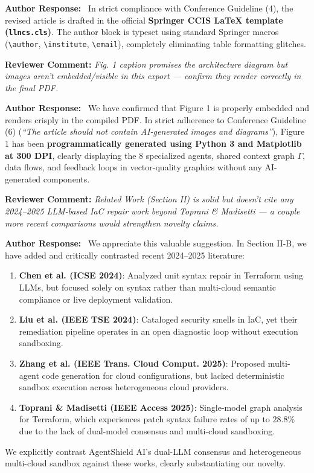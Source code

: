 \documentclass[11pt,a4paper]{article}
\newcommand{\reviewercomment}[1]{%
    \vspace{0.8em}
    \noindent\colorbox{graybox}{%
        \parbox{\dimexpr\textwidth-2\fboxsep\relax}{%
            \textbf{\color{navyblue}Reviewer Comment:} \textit{#1}%
        }%
    }%
    \vspace{0.4em}
}
\newcommand{\ourresponse}{%
    \noindent\textbf{\color{navyblue}Author Response:}\ %
}
\begin{document}
\ourresponse In strict compliance with Conference Guideline (4), the revised article is drafted in the official \textbf{Springer CCIS LaTeX template (\texttt{llncs.cls})}. The author block is typeset using standard Springer macros (\texttt{\textbackslash author}, \texttt{\textbackslash institute}, \texttt{\textbackslash email}), completely eliminating table formatting glitches.

\reviewercomment{Fig. 1 caption promises the architecture diagram but images aren't embedded/visible in this export — confirm they render correctly in the final PDF.}

\ourresponse We have confirmed that Figure 1 is properly embedded and renders crisply in the compiled PDF. In strict adherence to Conference Guideline (6) (\textit{``The article should not contain AI-generated images and diagrams''}), Figure 1 has been \textbf{programmatically generated using Python 3 and Matplotlib at 300 DPI}, clearly displaying the 8 specialized agents, shared context graph $\Gamma$, data flows, and feedback loops in vector-quality graphics without any AI-generated components.

\reviewercomment{Related Work (Section II) is solid but doesn't cite any 2024–2025 LLM-based IaC repair work beyond Toprani \& Madisetti — a couple more recent comparisons would strengthen novelty claims.}

\ourresponse We appreciate this valuable suggestion. In Section II-B, we have added and critically contrasted recent 2024--2025 literature:
\begin{enumerate}
    \item \textbf{Chen et al. (ICSE 2024)}: Analyzed unit syntax repair in Terraform using LLMs, but focused solely on syntax rather than multi-cloud semantic compliance or live deployment validation.
    \item \textbf{Liu et al. (IEEE TSE 2024)}: Cataloged security smells in IaC, yet their remediation pipeline operates in an open diagnostic loop without execution sandboxing.
    \item \textbf{Zhang et al. (IEEE Trans. Cloud Comput. 2025)}: Proposed multi-agent code generation for cloud configurations, but lacked deterministic sandbox execution across heterogeneous cloud providers.
    \item \textbf{Toprani \& Madisetti (IEEE Access 2025)}: Single-model graph analysis for Terraform, which experiences patch syntax failure rates of up to $28.8\%$ due to the lack of dual-model consensus and multi-cloud sandboxing.
\end{enumerate}
We explicitly contrast AgentShield AI's dual-LLM consensus and heterogeneous multi-cloud sandbox against these works, clearly substantiating our novelty.
\end{document}
